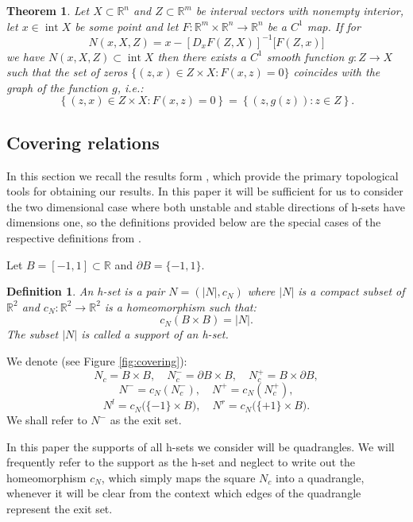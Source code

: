 \documentclass[1p]{article}
\newtheorem{definition}{Definition}
\newtheorem{theorem}{Theorem}
\DeclareMathOperator{\interior}{int}
\begin{document}
\begin{theorem}
    \label{thm:INM}
    \cite{Walawska2019ValidatedNF}
    Let $X \subset \mathbb{R}^n$ and $Z \subset \mathbb{R}^m$ be interval vectors with nonempty interior, let $x \in \interior X$ be some point and let $F : \mathbb{R}^m \times \mathbb{R}^n \to \mathbb{R}^n$ be a $C^1$ map. If for 
    \[
        N(x,X,Z) = x - \left[ D_x F(Z,X) \right]^{-1} \big[ F(Z,x) \big]
    \]
    we have $N(x,X,Z) \subset \interior X$ then there exists a $C^1$ smooth function $g : Z \to X$ such that the set of zeros $\{ (z,x) \in Z \times X : F(x,z) = 0 \}$ coincides with the graph of the function $g$, i.e.:
    \[
        \left\{ (z,x) \in Z \times X : F(x,z) = 0 \right\} = \left\{ (z,g(z)) : z \in Z \right\}.
    \]
\end{theorem}

\subsection{Covering relations}
In this section we recall the results form \cite{ZGLICZYNSKI200432}, which provide the primary topological tools for obtaining our results. In this paper it will be sufficient for us to consider the two dimensional case where both unstable and stable directions of h-sets have dimensions one, so the definitions provided below are the special cases of the respective definitions from \cite{ZGLICZYNSKI200432}.

Let $B = [-1,1]\subset \mathbb{R}$ and $\partial B = \{ -1, 1 \}$.

\begin{definition}
    \label{def:h_set}
    An h-set is a pair $N = \left( |N|, c_N \right)$ where $|N|$ is a compact subset of $\mathbb{R}^2$ and $c_N : \mathbb{R}^2  \to  \mathbb{R}^2$ is a homeomorphism such that:
    \[
        c_N \left( B \times B \right) = |N|.
    \]
    The subset $|N|$ is called a support of an h-set.
\end{definition}

We denote (see Figure \ref{fig:covering}):
\[
    N_c = B \times B, \quad
    N_c^- = \partial B \times B, \quad 
    N_c^+ = B \times \partial B,
\]
\[
    N^- = c_N ( N_c^- ), \quad
    N^+ = c_N ( N_c^+ ),
\]
\[
    N^{l} = c_N \big( \{ -1 \} \times B \big), \quad
    N^{r} = c_N \big( \{ +1 \} \times B \big).
\]
We shall refer to $N^-$ as the exit set.

In this paper the supports of all h-sets we consider will be quadrangles. We will frequently refer to the support as the h-set and neglect to write out the homeomorphism $c_N$, which simply maps the square $N_c$ into a quadrangle, whenever it will be clear from the context which edges of the quadrangle represent the exit set.
\end{document}

